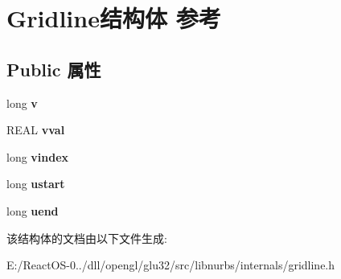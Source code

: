 \hypertarget{struct_gridline}{}\section{Gridline结构体 参考}
\label{struct_gridline}
\subsection*{Public 属性}
\begin{DoxyCompactItemize}
\item 
\mbox{\label{struct_gridline_ab2038b4dc4f4f2ea631e587b4c6831be}} 
long {\bfseries v}
\item 
\mbox{\label{struct_gridline_a0dcdf128b31131718be475e820c1a586}} 
R\+E\+AL {\bfseries vval}
\item 
\mbox{\label{struct_gridline_abf3c2d031f44a440ecd4e54e3c3bfe69}} 
long {\bfseries vindex}
\item 
\mbox{\label{struct_gridline_a619f14089aa293cb64445c25acba064d}} 
long {\bfseries ustart}
\item 
\mbox{\label{struct_gridline_a5b62e843f844a90d49237da98553a2a7}} 
long {\bfseries uend}
\end{DoxyCompactItemize}


该结构体的文档由以下文件生成\+:\begin{DoxyCompactItemize}
\item 
E\+:/\+React\+O\+S-\/0../dll/opengl/glu32/src/libnurbs/internals/gridline.\+h\end{DoxyCompactItemize}
